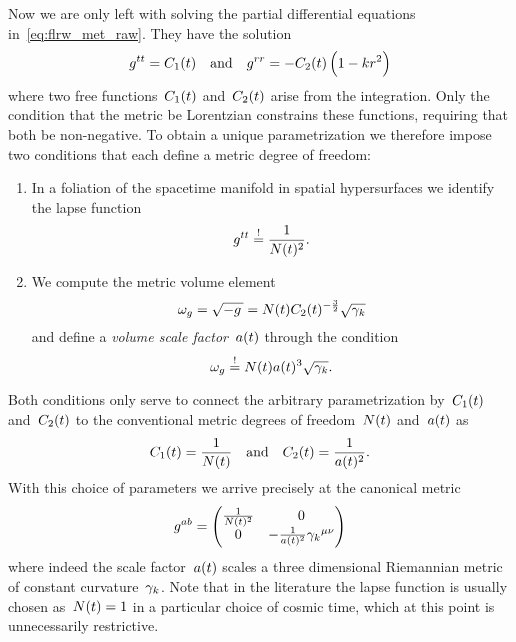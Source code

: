 Now we are only left with solving the partial differential equations in~\eqref{eq:flrw_met_raw}. They have the solution
\begin{equation}
	g^{tt}=C_1(t) \quad \text{and} \quad g^{rr}=-C_2(t)\left(1-k r{}^2\right)
\end{equation}
where two free functions~$C_1(t)$ and~$C_2(t)$ arise from the integration. Only the condition that the metric be Lorentzian constrains these functions, requiring that both be non-negative. To obtain a unique parametrization we therefore impose two conditions that each define a metric degree of freedom:
\begin{enumerate}
	\item In a foliation of the spacetime manifold in spatial hypersurfaces we identify the lapse function
	\begin{equation}
		g^{tt}\overset{!}{=}\frac{1}{N(t)^2}
		\mathpunct{.}
	\end{equation}
	\item We compute the metric volume element
	\begin{equation}
		\omega_g=\sqrt{-g\,}=N(t)C_2(t)^{-\frac{3}{2}}\sqrt{{\gamma_{k}}}
	\end{equation}
	and define a \emph{volume scale factor}~$a(t)$ through the condition
	\begin{equation}\label{eq:param_scalea_met}
		\omega_g\overset{!}{=}N(t)a(t)^3\sqrt{{\gamma_{k}}}
		\mathpunct{.}
	\end{equation}
\end{enumerate}
Both conditions only serve to connect the arbitrary parametrization by~$C_1(t)$ and~$C_2(t)$ to the conventional metric degrees of freedom~$N(t)$ and~$a(t)$ as
\begin{equation}
	C_1(t)=\frac{1}{N(t)} \quad \text{and} \quad C_2(t)=\frac{1}{a(t)^2}
	\mathpunct{.}
\end{equation}
With this choice of parameters we arrive precisely at the canonical \FLRW{} metric
\begin{align}\label{eq:flrw_metric}
	g^{ab}=\begin{pmatrix}
	\frac{1}{N(t)^2} & 0 \\
	0 & -\frac{1}{a(t)^2}{\gamma_{k}}^{\mu\nu}
	\end{pmatrix}
\end{align}
where indeed the scale factor~$a(t)$ scales a three dimensional Riemannian metric of constant curvature~${\gamma_{k}}$. Note that in the literature the lapse function is usually chosen as~${N(t)=1}$ in a particular choice of cosmic time, which at this point is unnecessarily restrictive.

